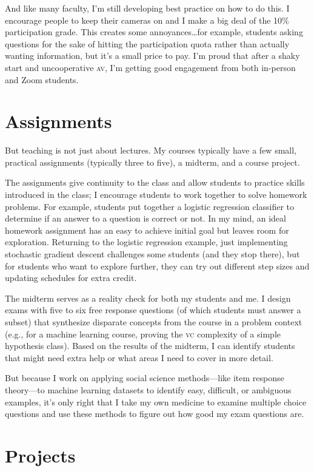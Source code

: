 \documentclass[11pt]{amsart}
\newcommand{\abr}[1]{\textsc{#1}}
\begin{document}
And like many faculty, I'm still developing best practice on how to do
this.  I encourage people to keep their cameras on and I make a big
deal of the 10\% participation grade.  This creates some
annoyances\dots for example, students asking questions for the sake of
hitting the participation quota rather than actually wanting
information, but it's a small price to pay.  I'm proud that after a
shaky start and uncooperative \abr{av}, I'm getting good engagement
from both in-person and Zoom students.

\section{Assignments}

But teaching is not just about lectures.  My courses typically have a
few small, practical assignments (typically three to five), a midterm,
and a course project.

The assignments give continuity to the class and allow students to
practice skills introduced in the class; I encourage students to work
together to solve homework problems.
%
For example, students put together a logistic regression classifier to
determine if an answer to a question is correct or not.  In my mind,
an ideal homework assignment has an easy to achieve initial goal but
leaves room for exploration.  Returning to the logistic regression
example, just implementing stochastic gradient descent challenges some
students (and they stop there), but for students who want to explore
further, they can try out different step sizes and updating schedules
for extra credit.

The midterm serves as a reality check for both my students and me.  I
design exams with five to six free response questions (of which
students must answer a subset) that synthesize disparate concepts from
the course in a problem context (e.g., for a machine learning course,
proving the \abr{vc} complexity of a simple hypothesis class).  Based
on the results of the midterm, I can identify students that might need
extra help or what areas I need to cover in more detail.

But because I work on applying social science methods---like item
response theory---to machine learning datasets to identify easy,
difficult, or ambiguous examples, it's only right that I take my own
medicine to examine multiple choice questions and use these methods to
figure out how good my exam questions are.

\section{Projects}
\end{document}
